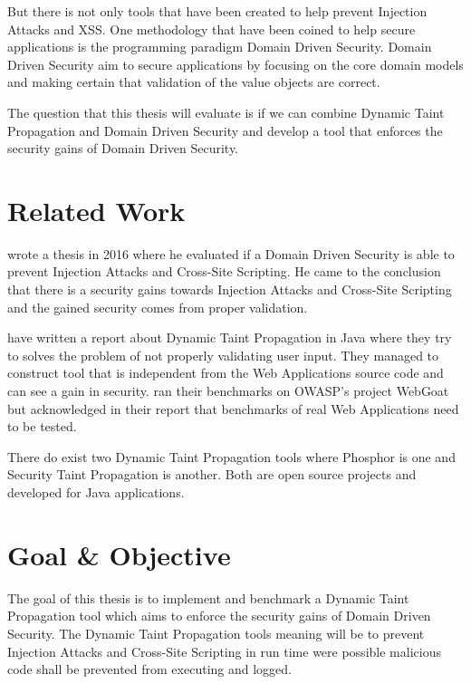 \documentclass{../kththesis}
\begin{document}
But there is not only tools that have been created to help prevent Injection Attacks and XSS. One methodology that have been coined to help secure applications is the programming paradigm Domain Driven Security. Domain Driven Security aim to secure applications by focusing on the core domain models and making certain that validation of the value objects are correct. \parencite{Wilander2009, Johnsson2009}

The question that this thesis will evaluate is if we can combine Dynamic Taint Propagation and Domain Driven Security and develop a tool that enforces the security gains of Domain Driven Security.


\section{Related Work}
\textcite{Stendahl2016} wrote a thesis in 2016 where he evaluated if a Domain Driven Security is able to prevent Injection Attacks and Cross-Site Scripting. He came to the conclusion that there is a security gains towards Injection Attacks and Cross-Site Scripting and the gained security comes from proper validation.

\textcite{Haldar} have written a report about Dynamic Taint Propagation in Java where they try to solves the problem of not properly validating user input. They managed to construct tool that is independent from the Web Applications source code and can see a gain in security. \textcite{Haldar} ran their benchmarks on OWASP's project WebGoat \parencite{webgoat} but acknowledged in their report that benchmarks of real Web Applications need to be tested.

There do exist two Dynamic Taint Propagation tools where Phosphor \parencite{phosphor} is one and Security Taint Propagation \parencite{securityTaint} is another. Both are open source projects and developed for Java applications.


\section{Goal \& Objective}
The goal of this thesis is to implement and benchmark a Dynamic Taint Propagation tool which aims to enforce the security gains of Domain Driven Security. The Dynamic Taint Propagation tools meaning will be to prevent Injection Attacks and Cross-Site Scripting in run time were possible malicious code shall be prevented from executing and logged.
\end{document}

